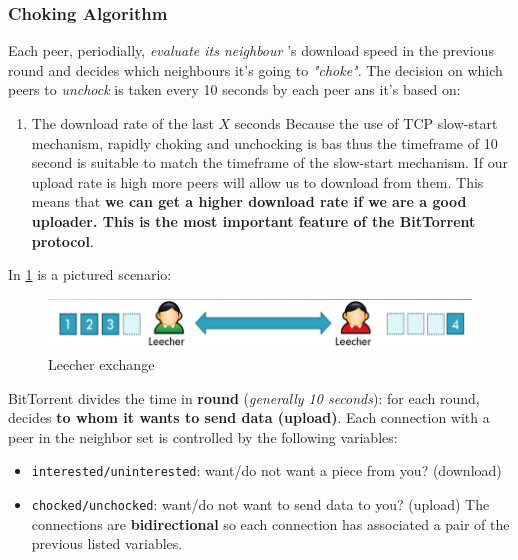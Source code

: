 \documentclass[10pt,a4paper]{report}
\begin{document}
\subsubsection{Choking Algorithm}\label{sec:choking-algorithm}
Each peer, periodially, \textit{evaluate its neighbour} 's download speed in the previous round and decides which neighbours it's going to \textit{"choke"}.
The decision on which peers to \textit{unchock} is taken every 10 seconds by each peer ans it's based on:
\begin{enumerate}
	\item 
	The download rate of the last $X$ seconds
	Because the use of TCP slow-start mechanism, rapidly choking and unchocking is bas thus the timeframe of 10 second is suitable to match the timeframe of the slow-start mechanism.
	If our upload rate is high more peers will allow us to download from them. This means that \textbf{we can get a higher download rate if we are a good uploader. This is the most important feature of the BitTorrent protocol}.
\end{enumerate}

In \ref{people-scenario} is a pictured scenario:
\begin{figure}[h]
	\centering
	\includegraphics[scale=0.50]{images/Pasted image 20230311103905.png}
	\caption{Leecher exchange}
	\label{people-scenario}
\end{figure}


BitTorrent divides the time in \textbf{round} (\textit{generally 10 seconds}): for each round, decides \textbf{to whom it wants to send data (upload)}. Each connection with a peer in the neighbor set is controlled by the following variables:
\begin{itemize}
	\item 
	\texttt{interested/uninterested}: want/do not want a piece from you? (download)
	\item 
	\texttt{chocked/unchocked}: want/do not want to send data to you? (upload)
	The connections are \textbf{bidirectional} so each connection has associated a pair of the previous listed variables.
\end{itemize}
\end{document}
